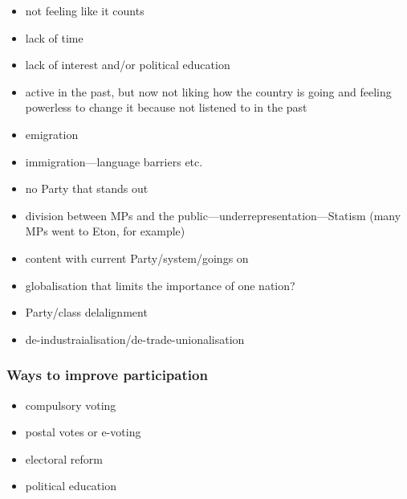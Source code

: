 \documentclass[a4paper,12pt]{article}
\begin{document}
\begin{itemize}
\item{not feeling like it counts}
\item{lack of time}
\item{lack of interest and/or political education}
\item{active in the past, but now not liking how the country is going and feeling powerless to change it because not listened to in the past}
\item{emigration}
\item{immigration---language barriers etc.}
\item{no Party that stands out}
\item{division between MPs and the public---underrepresentation---Statism (many MPs went to Eton, for example)}
\item{content with current Party/system/goings on}
\item{globalisation that limits the importance of one nation?}
\item{Party/class delalignment}
\item{de-industraialisation/de-trade-unionalisation}
\end{itemize}

\subsubsection*{Ways to improve participation}

\begin{itemize}
\item{compulsory voting}
\item{postal votes or e-voting}
\item{electoral reform}
\item{political education}
\end{itemize}
\end{document}
